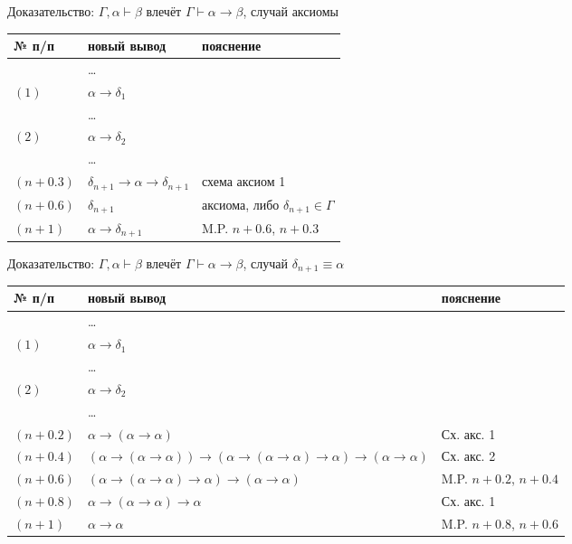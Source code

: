 \documentclass[aspectratio=169]{beamer}
\begin{document}
\begin{frame}{Доказательство: $\Gamma,\alpha\vdash\beta$ влечёт $\Gamma\vdash\alpha\rightarrow\beta$, случай аксиомы}
\begin{tabular}{lll}
№ п/п & новый вывод & пояснение \\
\hline
& \dots\\
$(1)$ & $\alpha\rightarrow\delta_1$ \\
& \dots\\
$(2)$ & $\alpha\rightarrow\delta_2$ \\
    & \dots \\
\color{cyan}$(n+0.3)$ & \color{cyan}$\delta_{n+1}\rightarrow\alpha\rightarrow\delta_{n+1}$ & \color{cyan}схема аксиом 1\\
\color{cyan}$(n+0.6)$ & \color{cyan}$\delta_{n+1}$ & \color{cyan}аксиома, либо $\delta_{n+1} \in \Gamma$\\
$(n+1)$ & $\alpha\rightarrow\delta_{n+1}$ & M.P. $n+0.6$, $n+0.3$\\
\end{tabular}
\end{frame}

\begin{frame}{Доказательство: $\Gamma,\alpha\vdash\beta$ влечёт $\Gamma\vdash\alpha\rightarrow\beta$, случай $\delta_{n+1}\equiv\alpha$}
\begin{tabular}{lll}
№ п/п & новый вывод & пояснение \\
\hline
    & \dots \\
$(1)$ & $\alpha\rightarrow\delta_1$ \\
    & \dots \\
$(2)$ & $\alpha\rightarrow\delta_2$ \\
    & \dots \\
\color{cyan}$(n+0.2)$ & \color{cyan}$\alpha \rightarrow (\alpha \rightarrow \alpha)$ & \color{cyan} Сх. акс. 1\\
\color{cyan}$(n+0.4)$ & \color{cyan}$(\alpha \rightarrow (\alpha \rightarrow \alpha)) \rightarrow 
  (\alpha \rightarrow (\alpha \rightarrow \alpha) \rightarrow \alpha) \rightarrow
  (\alpha \rightarrow \alpha)$& \color{cyan}Сх. акс. 2\\
\color{cyan}$(n+0.6)$ & \color{cyan}$(\alpha \rightarrow (\alpha \rightarrow \alpha) \rightarrow \alpha) \rightarrow
  (\alpha \rightarrow \alpha)$ &\color{cyan}M.P. $n+0.2$, $n+0.4$\\
\color{cyan}$(n+0.8)$ & \color{cyan}$\alpha \rightarrow (\alpha \rightarrow \alpha) \rightarrow \alpha$ & 
    \color{cyan}Сх. акс. 1\\
$(n+1)$ & $\alpha \rightarrow \alpha$ & M.P. $n+0.8$, $n+0.6$\\
\end{tabular}
\end{frame}
\end{document}
